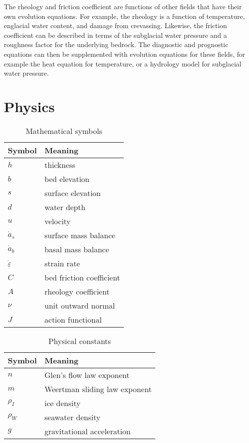 \documentclass[journal abbreviation, manuscript]{copernicus}
\begin{document}
The rheology and friction coefficient are functions of other fields that have their own evolution equations.
For example, the rheology is a function of temperature, englacial water content, and damage from crevassing.
Likewise, the friction coefficient can be described in terms of the subglacial water pressure and a roughness factor for the underlying bedrock.
The diagnostic and prognostic equations can then be supplemented with evolution equations for these fields, for example the heat equation for temperature, or a hydrology model for subglacial water pressure.


\section{Physics}

\begin{table}[h]
    \begin{tabular}{l|l}
        Symbol & Meaning \\
        \hline
        $h$ & thickness \\
        $b$ & bed elevation  \\
        $s$ & surface elevation  \\
        $d$ & water depth \\
        $u$ & velocity \\
        $\dot a_s$ & surface mass balance \\
        $\dot a_b$ & basal mass balance \\
        $\dot\varepsilon$ & strain rate \\
        $C$ & bed friction coefficient \\
        $A$ & rheology coefficient \\
        $\nu$ & unit outward normal \\
        $J$ & action functional
    \end{tabular}
    \caption{Mathematical symbols}
\end{table}

\begin{table}[h]
    \begin{tabular}{l|l}
        Symbol & Meaning \\
        \hline
        $n$ & Glen's flow law exponent \\
        $m$ & Weertman sliding law exponent \\
        $\rho_I$ & ice density \\
        $\rho_W$ & seawater density \\
        $g$ & gravitational acceleration
    \end{tabular}
    \caption{Physical constants}
\end{table}
\end{document}
